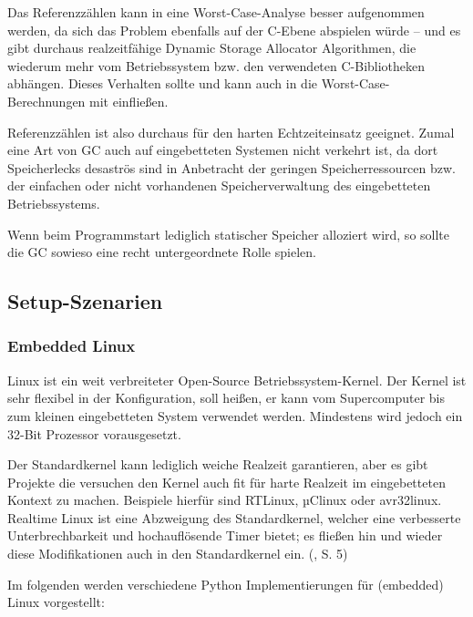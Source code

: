 Das Referenzzählen kann in eine Worst-Case-Analyse besser aufgenommen werden,
da sich das Problem ebenfalls auf der C-Ebene abspielen würde -- und es gibt
durchaus realzeitfähige Dynamic Storage Allocator Algorithmen, die wiederum
mehr vom Betriebssystem bzw. den verwendeten C-Bibliotheken abhängen. Dieses
Verhalten sollte und kann auch in die Worst-Case-Berechnungen mit einfließen. \cite{malloc}

Referenzzählen ist also durchaus für den harten Echtzeiteinsatz geeignet.
Zumal eine Art von GC auch auf eingebetteten Systemen nicht verkehrt ist, da
dort Speicherlecks desaströs sind in Anbetracht der geringen
Speicherressourcen bzw. der einfachen oder nicht vorhandenen
Speicherverwaltung des eingebetteten Betriebssystems.\cite{refcount}

Wenn beim Programmstart lediglich statischer Speicher alloziert wird, so
sollte die GC sowieso eine recht untergeordnete Rolle spielen.


\subsection{Setup-Szenarien}


\subsubsection{Embedded Linux}


Linux ist ein weit verbreiteter Open-Source Betriebssystem-Kernel. Der Kernel
ist sehr flexibel in der Konfiguration, soll heißen, er kann vom Supercomputer
bis zum kleinen eingebetteten System verwendet werden. Mindestens wird jedoch
ein 32-Bit Prozessor vorausgesetzt.

Der Standardkernel kann lediglich weiche Realzeit garantieren, aber es gibt
Projekte die versuchen den Kernel auch fit für harte Realzeit im eingebetteten
Kontext zu machen. Beispiele hierfür sind RTLinux, µClinux oder avr32linux.
Realtime Linux ist eine Abzweigung des Standardkernel, welcher eine
verbesserte Unterbrechbarkeit und hochauflösende Timer bietet; es fließen hin
und wieder diese Modifikationen auch in den Standardkernel ein. (\cite{dipl}, S. 5)

Im folgenden werden verschiedene Python Implementierungen für (embedded) Linux
vorgestellt:


